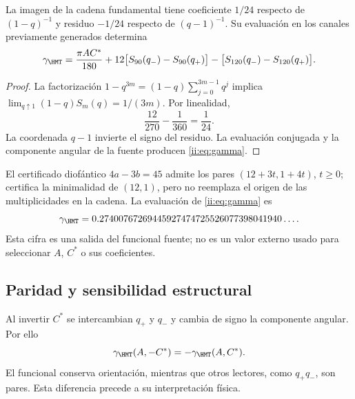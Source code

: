 \begin{theorem}
La imagen de la cadena fundamental tiene coeficiente $1/24$
respecto de $(1-q)^{-1}$ y residuo $-1/24$ respecto de $(q-1)^{-1}$.
Su evaluación en los canales previamente generados determina
\begin{equation}
\gamma_{\HMT}=
\frac{\pi AC^*}{180}
+12\bigl[S_{90}(q_-)-S_{90}(q_+)\bigr]
-\bigl[S_{120}(q_-)-S_{120}(q_+)\bigr].
\label{ii:eq:gamma}
\end{equation}
\end{theorem}
\begin{proof}
La factorización $1-q^{3m}=(1-q)\sum_{j=0}^{3m-1}q^j$ implica
$\lim_{q\uparrow1}(1-q)S_m(q)=1/(3m)$. Por linealidad,
\[
\frac{12}{270}-\frac1{360}=\frac1{24}.
\]
La coordenada $q-1$ invierte el signo del residuo.
La evaluación conjugada y la componente angular de la fuente
producen \eqref{ii:eq:gamma}.
\end{proof}

El certificado diofántico $4a-3b=45$ admite los pares
$(12+3t,1+4t)$, $t\ge0$; certifica la minimalidad de $(12,1)$,
pero no reemplaza el origen de las multiplicidades en la cadena.
La evaluación de \eqref{ii:eq:gamma} es
\[
\gamma_{\HMT}
=0.27400767269445927474725526077398041940\ldots.
\]
Esta cifra es una salida del funcional fuente; no es un valor externo
usado para seleccionar $A$, $C^*$ o sus coeficientes.

\subsection{Paridad y sensibilidad estructural}
Al invertir $C^*$ se intercambian $q_+$ y $q_-$ y cambia de signo
la componente angular. Por ello
\[
\gamma_{\HMT}(A,-C^*)=-\gamma_{\HMT}(A,C^*).
\]
El funcional conserva orientación, mientras que otros lectores,
como $q_+q_-$, son pares. Esta diferencia precede a su interpretación física.
